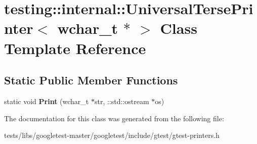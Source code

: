 \hypertarget{classtesting_1_1internal_1_1UniversalTersePrinter_3_01wchar__t_01_5_01_4}{}\section{testing\+:\+:internal\+:\+:Universal\+Terse\+Printer$<$ wchar\+\_\+t $\ast$ $>$ Class Template Reference}
\label{classtesting_1_1internal_1_1UniversalTersePrinter_3_01wchar__t_01_5_01_4}
\subsection*{Static Public Member Functions}
\begin{DoxyCompactItemize}
\item 
\mbox{\label{classtesting_1_1internal_1_1UniversalTersePrinter_3_01wchar__t_01_5_01_4_a9cdf673b44d19e6879253f30f11cd740}} 
static void {\bfseries Print} (wchar\+\_\+t $\ast$str, \+::std\+::ostream $\ast$os)
\end{DoxyCompactItemize}


The documentation for this class was generated from the following file\+:\begin{DoxyCompactItemize}
\item 
tests/libs/googletest-\/master/googletest/include/gtest/gtest-\/printers.\+h\end{DoxyCompactItemize}
